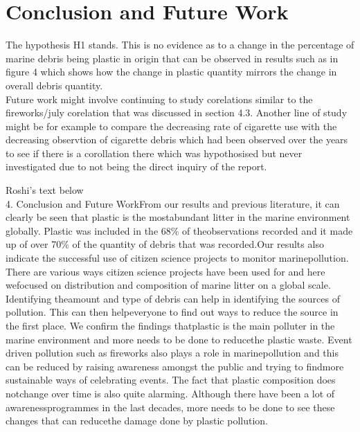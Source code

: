 \documentclass[10pt]{article}\usepackage[]{graphicx}\usepackage[]{color}
\begin{document}
\section{Conclusion and Future Work}\label{cdsmote1}

The hypothesis H1 stands. This is no evidence as to a change in the percentage of marine debris being plastic in origin that can be observed in results such as in figure 4 which shows how the change in plastic quantity mirrors the change in overall debris quantity. \\

Future work might involve continuing to study corelations similar to the fireworks/july corelation that was discussed in section 4.3. Another line of study might be for example to compare the decreasing rate of cigarette use with the decreasing observtion of cigarette debris which had been observed over the years to see if there is a corollation there which was hypothosised but never investigated due to not being the direct inquiry of the report.     

Roshi's text below\\
4. Conclusion and Future WorkFrom our results and previous literature, it can clearly be seen that plastic is the mostabundant litter in the marine environment globally. Plastic was included in the 68\% of theobservations recorded and it made up of over 70\% of the quantity of debris that was recorded.Our results also indicate the successful use of citizen science projects to monitor marinepollution. There are various ways citizen science projects have been used for and here wefocused on distribution and composition of marine litter on a global scale. Identifying theamount and type of debris can help in identifying the sources of pollution. This can then helpeveryone to find out ways to reduce the source in the first place. We confirm the findings thatplastic is the main polluter in the marine environment and more needs to be done to reducethe plastic waste. Event driven pollution such as fireworks also plays a role in marinepollution and this can be reduced by raising awareness amongst the public and trying to findmore sustainable ways of celebrating events. The fact that plastic composition does notchange over time is also quite alarming. Although there have been a lot of awarenessprogrammes in the last decades, more needs to be done to see these changes that can reducethe damage done by plastic pollution.  \\
\end{document}
